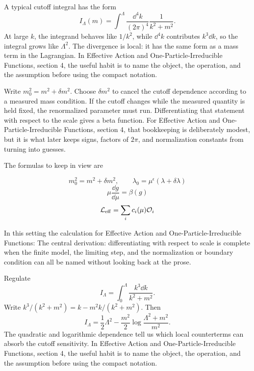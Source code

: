 A typical cutoff integral has the form
\[
  I_\Lambda(m)=\int^{\Lambda}\frac{\dd^4k}{(2\pi)^4}\frac{1}{k^2+m^2}.
\]
At large \(k\), the integrand behaves like \(1/k^2\), while \(\dd^4k\) contributes \(k^3\dd k\), so the integral grows like \(\Lambda^2\).  The divergence is local: it has the same form as a mass term in the Lagrangian.  In Effective Action and One-Particle-Irreducible Functions, section 4, the useful habit is to name the object, the operation, and the assumption before using the compact notation.

Write \(m_0^2=m^2+\delta m^2\).  Choose \(\delta m^2\) to cancel the cutoff dependence according to a measured mass condition.  If the cutoff changes while the measured quantity is held fixed, the renormalized parameter must run.  Differentiating that statement with respect to the scale gives a beta function.  For Effective Action and One-Particle-Irreducible Functions, section 4, that bookkeeping is deliberately modest, but it is what later keeps signs, factors of \(2\pi\), and normalization constants from turning into guesses.

The formulas to keep in view are

\[
  m_0^2=m^2+\delta m^2,\qquad \lambda_0=\mu^\epsilon(\lambda+\delta\lambda)
\]
\[
  \mu\frac{\dd g}{\dd\mu}=\beta(g)
\]
\[
  \mathcal L_{\mathrm{eff}}=\sum_i c_i(\mu)\mathcal O_i
\]

In this setting the calculation for Effective Action and One-Particle-Irreducible Functions: The central derivation: differentiating with respect to scale is complete when the finite model, the limiting step, and the normalization or boundary condition can all be named without looking back at the prose.




\begin{example}
Regulate
\[
  I_\Lambda=\int_0^\Lambda\frac{k^3\dd k}{k^2+m^2}.
\]
Write \(k^3/(k^2+m^2)=k-m^2k/(k^2+m^2)\).  Then
\[
  I_\Lambda=\frac12\Lambda^2-\frac{m^2}{2}\log\frac{\Lambda^2+m^2}{m^2}.
\]
The quadratic and logarithmic dependence tell us which local counterterms can absorb the cutoff sensitivity.  In Effective Action and One-Particle-Irreducible Functions, section 4, the useful habit is to name the object, the operation, and the assumption before using the compact notation.
\end{example}




